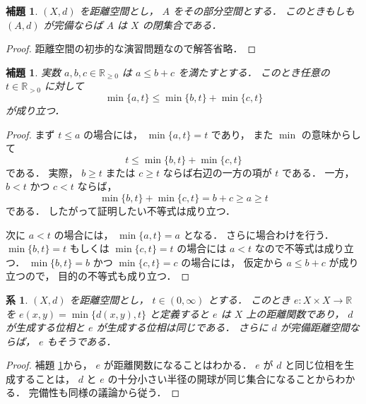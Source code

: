 \documentclass[leqno, 12pt]{jsarticle}
\newtheorem{cor}[thm]{系}
\newtheorem{lem}[thm]{補題}
\newcommand{\rr}{\mathbb{R}}
\newcommand{\pospart}[1]{#1_{>0}}
\newcommand{\rrpos}{\pospart{\rr}}
\begin{document}
\begin{lem}\label{lem:hanasi:comp}
$(X, d)$
を距離空間とし，
$A$
をその部分空間とする．
このときもしも
$(A, d)$
が完備ならば
$A$
は
$X$
の閉集合である．
\end{lem}
\begin{proof}
距離空間の初歩的な演習問題なので解答省略．
\end{proof}
\begin{lem}\label{lem:hanasi:minlem}
実数
$a, b, c\in \rr_{\ge 0}$
は
$a\le b+c$
を満たすとする．
このとき任意の
$t\in \rrpos$
に対して
\[
\min\{a, t\}\le \min\{b, t\}+\min\{c, t\}
\]
が成り立つ．
\end{lem}
\begin{proof}
まず
$t\le a$
の場合には，
$\min\{a, t\}=t$
であり，%
また
$\min$
の意味からして
\[
t\le \min\{b, t\}+\min\{c, t\}
\]
である．
実際，
$b\ge t$
または
$c\ge t$
ならば右辺の一方の項が
$t$
である．
一方，
$b<t$
かつ
$c<t$
ならば，
\[
\min\{b,t\}+\min\{c,t\}
=b+c
\ge a
\ge t
\]
である．
したがって証明したい不等式は成り立つ．

次に
$a<t$
の場合には，
$\min\{a, t\}=a$
となる．
さらに場合わけを行う．
$\min\{b, t\}=t$
 もしくは
 $\min\{c, t\}=t$
 の場合には
$a<t$
なので不等式は成り立つ．
$\min\{b, t\}=b$
かつ
$\min\{c, t\}=c$
の場合には，
仮定から
$a\le b+c$
が成り立つので，
目的の不等式も成り立つ．
\end{proof}

\begin{cor}\label{cor:hanasi:mindis}
$(X, d)$
を距離空間とし，
$t\in (0, \infty)$
とする．%
このとき
$e\colon  X\times X\to \rr$%
を
$e(x, y)=\min\{d(x, y), t\}$
と定義すると
$e$
は
$X$
上の距離関数であり，
$d$
が生成する位相と
$e$
が生成する位相は同じである．
さらに
$d$
が完備距離空間ならば，
$e$
もそうである．
\end{cor}
\begin{proof}
補題
\ref{lem:hanasi:minlem}から，
$e$
が距離関数になることはわかる．
$e$
が
$d$
と同じ位相を生成することは，
$d$
と
$e$
の十分小さい半径の開球が同じ集合になることからわかる．
完備性も同様の議論から従う．
\end{proof}





\end{document}
